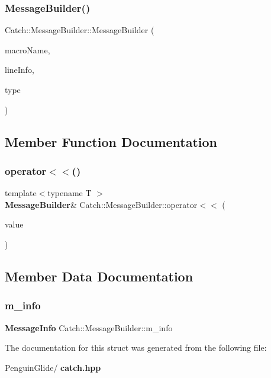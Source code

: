 \subsubsection{MessageBuilder()}
{\footnotesize\ttfamily Catch\+::\+Message\+Builder\+::\+Message\+Builder (\begin{DoxyParamCaption}\item[{\textbf{ String\+Ref} const \&}]{macro\+Name,  }\item[{\textbf{ Source\+Line\+Info} const \&}]{line\+Info,  }\item[{\textbf{ Result\+Was\+::\+Of\+Type}}]{type }\end{DoxyParamCaption})}



\subsection{Member Function Documentation}
\mbox{\label{struct_catch_1_1_message_builder_a20fa48d069b20dddcc2d3df8abb123c1}} 
\subsubsection{operator$<$$<$()}
{\footnotesize\ttfamily template$<$typename T $>$ \\
\textbf{ Message\+Builder}\& Catch\+::\+Message\+Builder\+::operator$<$$<$ (\begin{DoxyParamCaption}\item[{T const \&}]{value }\end{DoxyParamCaption})\hspace{0.3cm}{\ttfamily [inline]}}



\subsection{Member Data Documentation}
\mbox{\label{struct_catch_1_1_message_builder_a979f1c2b36d78f80ee275bfa5ba0209f}} 
\subsubsection{m\_info}
{\footnotesize\ttfamily \textbf{ Message\+Info} Catch\+::\+Message\+Builder\+::m\+\_\+info}



The documentation for this struct was generated from the following file\+:\begin{DoxyCompactItemize}
\item 
Penguin\+Glide/\textbf{ catch.\+hpp}\end{DoxyCompactItemize}
